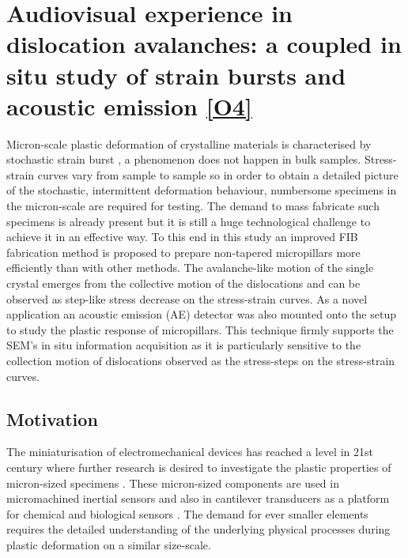 \chapter[In-situ study of avalanches]{Audiovisual experience in dislocation avalanches: a coupled in situ study of strain bursts and acoustic emission \hyperref[paper:A1]{[O4]}} \label{chapter:in_situ}

\ifpdf
    \graphicspath{{Chapter3/Figs/Raster/}{Chapter3/Figs/PDF/}{Chapter3/Figs/}}
\else
    \graphicspath{{Chapter3/Figs/Vector/}{Chapter3/Figs/}}
\fi

Micron-scale plastic deformation of crystalline materials is characterised by stochastic strain burst \cite{PhysRevLett.89.165501,weiss2003three,PhysRevLett.93.195507,1742-5468-2005-08-P08004,Zapperi2012}, a phenomenon does not happen in bulk samples. Stress-strain curves vary from sample to sample so in order to obtain a detailed picture of the stochastic, intermittent deformation behaviour, numbersome specimens in the micron-scale are required for testing. The demand to mass fabricate such specimens is already present but it is still a huge technological challenge to achieve it in an effective way. To this end in this study an improved FIB fabrication method is proposed to prepare non-tapered micropillars more efficiently than with other methods. The avalanche-like motion of the single crystal emerges from the collective motion of the dislocations and can be observed as step-like stress decrease on the stress-strain curves. As a novel application an acoustic emission (AE)  detector was also mounted onto the setup to study the plastic response of micropillars. This technique firmly supports the SEM's in situ information acquisition as it is particularly sensitive to the collection motion of dislocations observed as the stress-steps on the stress-strain curves.

\section{Motivation}
The miniaturisation of electromechanical devices has reached a level in 21st century where further research is desired to investigate the plastic properties of micron-sized specimens \cite{doi:10.1080/14786430600567739,NG20081712,doi:10.1080/14786430802132522,doi:10.1146/annurev-matsci-082908-145409,ZHOU20117673}. These micron-sized components are used in micromachined inertial sensors \cite{704269} and also in cantilever transducers as a platform for chemical and biological sensors \cite{doi:10.1063/1.1763252}. The demand for ever smaller elements requires the detailed understanding of the underlying physical processes during plastic deformation on a similar size-scale.

